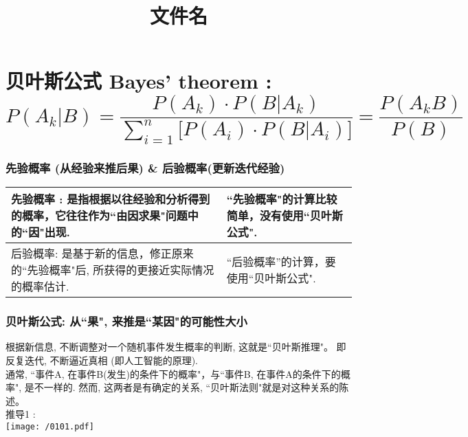 \documentclass[UTF8]{ctexart}
\title{文件名}
\begin{document}
	\tableofcontents %
	\date{} %
	\maketitle  %
	



\part{贝叶斯公式 Bayes' theorem : \\ $ 
		P\left( A_k|B \right) =\dfrac{P\left( A_k \right) \cdot P\left( B|A_k \right)}{\sum_{i=1}^n{\text{[}}P\left( A_i \right) \cdot P\left( B|A_i \right) \text{]}}=\dfrac{P\left( A_kB \right)}{P\left( B \right)}
		$}




\section{先验概率 (从经验来推后果) \& 后验概率(更新迭代经验)}

\begin{tabular}{|p{}|p{}|}
	\hline
	先验概率 :	是指根据以往经验和分析得到的概率，它往往作为``由因求果"问题中的``因"出现.  
	&   
	``先验概率"的计算比较简单，没有使用``贝叶斯公式". \\
	\hline
	后验概率: 是基于新的信息，修正原来的``先验概率"后, 所获得的更接近实际情况的概率估计.	
	& ``后验概率''的计算，要使用``贝叶斯公式".
	\\
	\hline
\end{tabular} 
\vspace{1em} 



\section{贝叶斯公式: 从``果", 来推是``某因"的可能性大小}

根据新信息, 不断调整对一个随机事件发生概率的判断, 这就是``贝叶斯推理"。 即反复迭代, 不断逼近真相 (即人工智能的原理). \\

通常, ``事件A, 在事件B(发生)的条件下的概率"，与``事件B, 在事件A的条件下的概率", 是不一样的. 然而, 这两者是有确定的关系, ``贝叶斯法则"就是对这种关系的陈述。 \\

推导1 : \\
\texttt{[image: /0101.pdf]} \\
\end{document}
